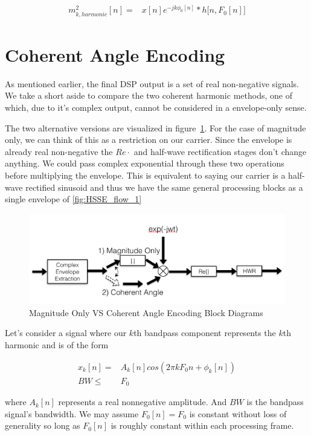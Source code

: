 \documentclass [11pt, proquest,oneside] {ganter_thesis}[2015/03/03]
\begin{document}
\begin{align}
m^2_{k,harmonic}[n] =& x[n] e^{-jk\phi_0 [n]} * h\big[n, F_0[n] \big]
\end{align}

\section{Coherent Angle Encoding}

As mentioned earlier, the final DSP output is a set of real non-negative signals.  We take a short aside to compare the two coherent harmonic methods, one of which, due to it's complex output, cannot be considered in a envelope-only sense.

The two alternative versions are visualized in figure~\ref{fig:coherent_angle}.  For the case of magnitude only, we can think of this as a restriction on our carrier.  Since the envelope is already real non-negative the $Re{\cdot}$ and half-wave rectification stages don't change anything.  We could pass complex exponential through these two operations before multiplying the envelope.  This is equivalent to saying our carrier is a half-wave rectified sinusoid and thus we have the same general processing blocks as a single envelope of \ref{fig:HSSE_flow_1}

\begin{figure}[!ht]
  \centering
    \includegraphics[width=1\textwidth]{coherent_angle}   
    \caption{Magnitude Only VS Coherent Angle Encoding Block Diagrams}
    \label{fig:coherent_angle}
\end{figure}

Let's consider a signal where our $k$th bandpass component represents the $k$th harmonic and is of the form

\begin{align}
x_k[n] =& A_k[n]cos(2\pi kF_0n + \phi_k[n]) \\
BW \leq& F_0 \nonumber
\end{align}

where $A_k[n]$ represents a real nonnegative amplitude.  And $BW$ is the bandpass signal's bandwidth.  We may assume $F_0[n] = F_0$ is constant without loss of generality so long as $F_0[n]$ is roughly constant within each processing frame.
\end{document}
